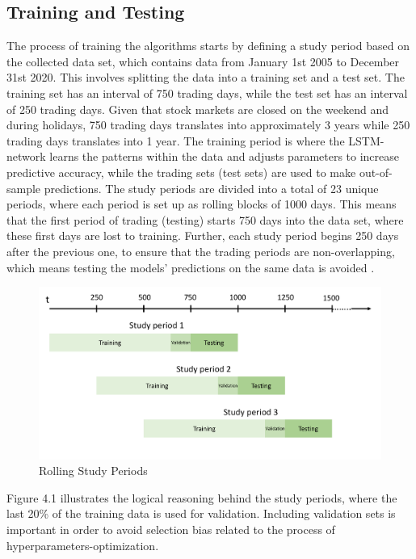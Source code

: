 \subsection{Training and Testing}
The process of training the algorithms starts by defining a study period based on the collected data set, which contains data from January 1st 2005 to December 31st 2020. This involves splitting the data into a training set and a test set. The training set has an interval of 750 trading days, while the test set has an interval of 250 trading days. Given that stock markets are closed on the weekend and during holidays, 750 trading days translates into approximately 3 years while 250 trading days translates into 1 year. The training period is where the LSTM-network learns the patterns within the data and adjusts parameters to increase predictive accuracy, while the trading sets (test sets) are used to make out-of-sample predictions. The study periods are divided into a total of 23 unique periods, where each period is set up as rolling blocks of 1000 days. This means that the first period of trading (testing) starts 750 days into the data set, where these first days are lost to training. Further, each study period begins 250 days after the previous one, to ensure that the trading periods are non-overlapping, which means testing the models' predictions on the same data is avoided \cite{krauss}. 
\indent\newline 
\begin{figure}[H]
\centering
\includegraphics [scale=0.48,angle=360]{figures/study.png}
\caption{Rolling Study Periods}
\label{fig:study}
\end{figure}

\indent\newline 
Figure 4.1 illustrates the logical reasoning behind the study periods, where the last 20\% of the training data is used for validation. Including validation sets is important in order to avoid selection bias related to the process of hyperparameters-optimization.

